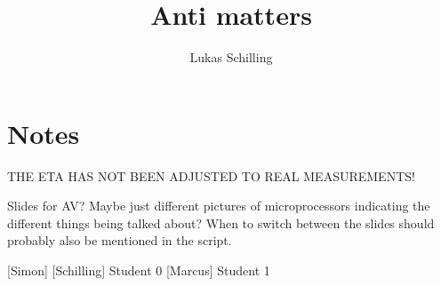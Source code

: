 \documentclass{article}
\title{Anti matters}                   %
\author{Lukas Schilling}  %
\begin{document}
                
\maketitle
\section*{Notes}
THE ETA HAS NOT BEEN ADJUSTED TO REAL MEASUREMENTS!

Slides for AV? Maybe just different pictures of microprocessors indicating the different things being talked about?
When to switch between the slides should probably also be mentioned in the script.

\begin{roles}
 [Simon]
 [Schilling] Student 0
 [Marcus] Student 1
\end{roles}

\begin{props}
\end{props}
\end{document}
